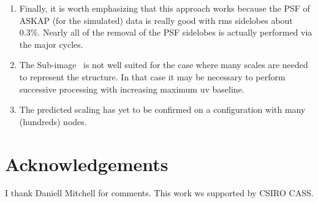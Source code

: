 \documentclass[11pt,a4paper,variablewidth]{article}
\begin{document}
\begin{enumerate}
	\item Finally, it is worth emphasizing that this approach works because the PSF of ASKAP (for the simulated) data is really good with rms sidelobes about 0.3\%. Nearly all of the removal of the PSF sidelobes is actually performed via the major cycles.
	\item The Sub-image \MAM\ is not well suited for the case where many scales are needed to represent the structure. In that case it may be necessary to perform successive processing with increasing maximum uv baseline.
	\item The predicted scaling has yet to be confirmed on a configuration with many (hundreds) nodes.
\end{enumerate}

\pagebreak
\section{Acknowledgements}

I thank Daniell Mitchell for comments. This work ws supported by CSIRO CASS.
\end{document}
